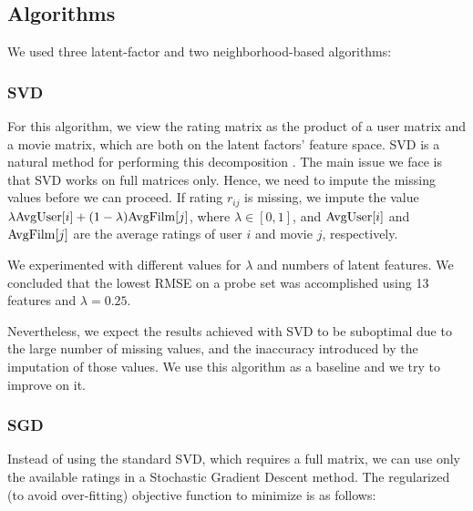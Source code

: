 \documentclass[10pt,conference,compsocconf]{IEEEtran}
\begin{document}
	\subsection{Algorithms}
	We used three latent-factor and two neighborhood-based algorithms:
	
	\subsubsection*{\textbf{SVD}} For this algorithm, we view the rating matrix as the product of a user matrix and a movie matrix, which are both on the latent factors' feature space. SVD is a natural method for performing this decomposition \cite{Koren09matrixfactorization}. The main issue we face is that SVD works on full matrices only. Hence, we need to impute the missing values before we can proceed. If rating $r_{ij}$ is missing, we impute the value $\lambda \textnormal{AvgUser}[i] + (1 - \lambda) \textnormal{AvgFilm}[j]$, where $\lambda \in [0,1]$, and $\textnormal{AvgUser}[i]$ and $\textnormal{AvgFilm}[j]$ are the average ratings of user $i$ and movie $j$, respectively. 
	
	
	
	We experimented with different values for $\lambda$ and numbers of latent features. We concluded that the lowest RMSE on a probe set was accomplished using 13 features and $\lambda = 0.25$.
	
	Nevertheless, we expect the results achieved with SVD to be suboptimal due to the large number of missing values, and the inaccuracy introduced by the imputation of those values. We use this algorithm as a baseline and we try to improve on it.
	
	\subsubsection*{\textbf{SGD}} Instead of using the standard SVD, which requires a full matrix, we can use only the available ratings in a Stochastic Gradient Descent method. The regularized (to avoid over-fitting) objective function to minimize is as follows:
	
\end{document}
